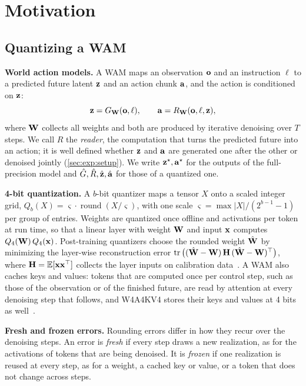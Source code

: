 \section{Motivation}
\label{sec:motivation}

\subsection{Quantizing a WAM}
\label{sec:prelim}

\noindent\textbf{World action models.}
A WAM maps an observation $\mathbf{o}$ and an instruction $\ell$ to a predicted future latent $\mathbf{z}$ and an action chunk $\mathbf{a}$, and the action is conditioned on $\mathbf{z}$:
\begin{equation}
  \mathbf{z} = G_{\mathbf{W}}(\mathbf{o}, \ell), \qquad \mathbf{a} = R_{\mathbf{W}}(\mathbf{o}, \ell, \mathbf{z}),
  \label{eq:wam}
\end{equation}
where $\mathbf{W}$ collects all weights and both are produced by iterative denoising over $T$ steps.
We call $R$ the \emph{reader}, the computation that turns the predicted future into an action; it is well defined whether $\mathbf{z}$ and $\mathbf{a}$ are generated one after the other or denoised jointly (\cref{sec:exp:setup}).
We write $\mathbf{z}^\star, \mathbf{a}^\star$ for the outputs of the full-precision model and $\hat G, \hat R, \hat{\mathbf{z}}, \hat{\mathbf{a}}$ for those of a quantized one.

\noindent\textbf{4-bit quantization.}
A $b$-bit quantizer maps a tensor $X$ onto a scaled integer grid, $Q_b(X) = \varsigma\cdot\operatorname{round}(X/\varsigma)$, with one scale $\varsigma = \max|X| / (2^{b-1}-1)$ per group of entries.
Weights are quantized once offline and activations per token at run time, so that a linear layer with weight $\mathbf{W}$ and input $\mathbf{x}$ computes $Q_4(\mathbf{W})\,Q_4(\mathbf{x})$.
Post-training quantizers choose the rounded weight $\hat{\mathbf{W}}$ by minimizing the layer-wise reconstruction error $\operatorname{tr}\big((\hat{\mathbf{W}}-\mathbf{W})\,\mathbf{H}\,(\hat{\mathbf{W}}-\mathbf{W})^\top\big)$, where $\mathbf{H} = \mathbb{E}[\mathbf{x}\mathbf{x}^\top]$ collects the layer inputs on calibration data~\cite{frantar2023gptq}.
A WAM also caches keys and values: tokens that are computed once per control step, such as those of the observation or of the finished future, are read by attention at every denoising step that follows, and W4A4KV4 stores their keys and values at 4 bits as well~\cite{ashkboos2024quarot,liu2025spinquant}.

\noindent\textbf{Fresh and frozen errors.}
Rounding errors differ in how they recur over the denoising steps.
An error is \emph{fresh} if every step draws a new realization, as for the activations of tokens that are being denoised.
It is \emph{frozen} if one realization is reused at every step, as for a weight, a cached key or value, or a token that does not change across steps.


